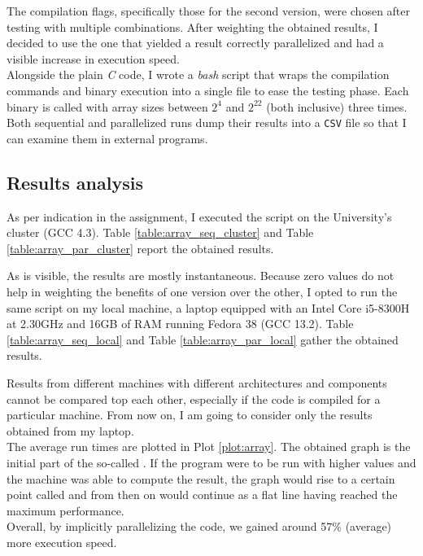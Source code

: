 The compilation flags, specifically those for the second version, were chosen after testing with multiple combinations. %
After weighting the obtained results, I decided to use the one that yielded a result correctly parallelized and had a visible %
increase in execution speed.\\
Alongside the plain \textit{C} code, I wrote a \textit{bash} script that wraps the compilation commands and binary execution %
into a single file to ease the testing phase. Each binary is called with array sizes between $2^4$ and $2^{22}$ (both inclusive) %
three times. Both sequential and parallelized runs dump their results into a \texttt{CSV} file so that I can examine %
them in external programs.%

\subsection*{Results analysis}
As per indication in the assignment, I executed the script on the University's cluster (GCC 4.3). Table %
\ref{table:array_seq_cluster} and Table \ref{table:array_par_cluster} report the obtained results.%

\begin{table}[h!tb]
    \centering
    \parbox{.45\linewidth}{
    }
    \parbox{.50\linewidth}{
    }
\end{table}

As is visible, the results are mostly instantaneous. Because zero values do not help in weighting the benefits of %
one version over the other, I opted to run the same script on my local machine, a laptop equipped with an Intel%
\textsuperscript{\textregistered} Core\textsuperscript{\texttrademark} i5-8300H at 2.30GHz and 16GB of RAM running Fedora %
38 (GCC 13.2). Table \ref{table:array_seq_local} and Table \ref{table:array_par_local} gather the obtained results.

\begin{table}[h!tb]
    \centering
    \parbox{.45\linewidth}{
    }
    \parbox{.50\linewidth}{
    }
\end{table}

Results from different machines with different architectures and components cannot be compared top each other, especially %
if the code is compiled for a particular machine. From now on, I am going to consider only the results obtained from my laptop.\\%
The average run times are plotted in Plot \ref{plot:array}. The obtained graph is the initial part of the so-called %
. If the program were to be run with higher values and the machine was able to compute the result, 
the graph would rise to a certain point called  and from then on would continue as a flat line having reached %
the maximum performance.\\%
Overall, by implicitly parallelizing the code, we gained around 57\% (average) more execution speed.%
